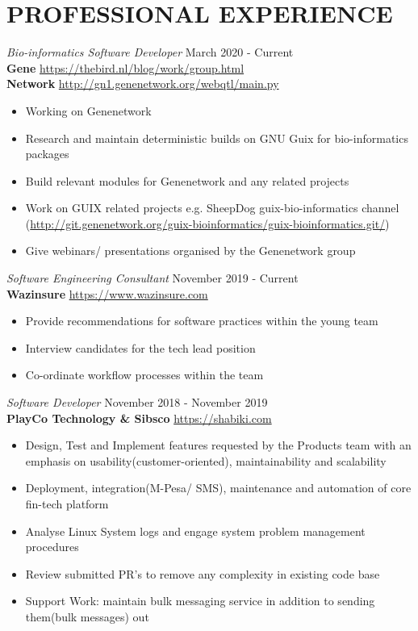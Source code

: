 \documentclass[margin, line]{res} %
\begin{document}


\section{PROFESSIONAL EXPERIENCE}

{\sl Bio-informatics Software Developer} \hfill March 2020 - Current \\
\textbf{Gene} \hfill \url{https://thebird.nl/blog/work/group.html} \\
\textbf{Network} \hfill \url{http://gn1.genenetwork.org/webqtl/main.py}

\begin{itemize} \itemsep -2pt
\item Working on Genenetwork
\item Research and maintain deterministic builds on GNU Guix for bio-informatics packages
\item Build relevant modules for Genenetwork and any related projects
\item Work on GUIX related projects e.g. SheepDog guix-bio-informatics channel (\url{http://git.genenetwork.org/guix-bioinformatics/guix-bioinformatics.git/})
\item Give webinars/ presentations organised by the Genenetwork group
\end{itemize}

{\sl Software Engineering Consultant} \hfill November 2019 - Current \\
\textbf{Wazinsure} \hfill \url{https://www.wazinsure.com}
\begin{itemize} \itemsep -2pt
\item Provide recommendations for software practices within the young team
\item Interview candidates for the tech lead position
\item Co-ordinate workflow processes within the team
\end{itemize}

{\sl Software Developer} \hfill November 2018 - November 2019 \\
\textbf{PlayCo Technology \& Sibsco } \hfill \url{https://shabiki.com}
\begin{itemize} \itemsep -2pt
\item Design, Test and Implement features requested by the Products team with an emphasis on usability(customer-oriented), maintainability and scalability
\item Deployment, integration(M-Pesa/ SMS), maintenance and automation of core fin-tech platform
\item Analyse Linux System logs and engage system problem management procedures
\item Review submitted PR’s to remove any complexity in existing code base
\item Support Work: maintain bulk messaging service in addition to sending them(bulk messages) out
\end{itemize}
\end{document}
